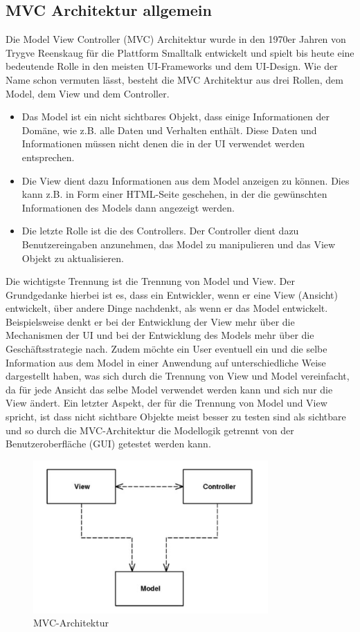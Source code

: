 \subsection{MVC Architektur allgemein}
Die Model View Controller (MVC) Architektur wurde in den 1970er Jahren von Trygve Reenskaug für die Plattform Smalltalk entwickelt und spielt bis heute eine bedeutende Rolle in den meisten UI-Frameworks und dem UI-Design\autocite[S. 330]{PEAA2002}.
Wie der Name schon vermuten lässt, besteht die MVC Architektur aus drei Rollen, dem Model, dem View und dem Controller.
\begin{itemize}
\item Das Model ist ein nicht sichtbares Objekt, dass einige Informationen der Domäne, wie z.B. alle Daten und Verhalten enthält. Diese Daten und Informationen müssen nicht denen die in der UI verwendet werden entsprechen\autocite[S. 330]{PEAA2002}.

\item Die View dient dazu Informationen aus dem Model anzeigen zu können. Dies kann z.B. in Form einer HTML-Seite geschehen, in der die gewünschten Informationen des Models dann angezeigt werden\autocite[S. 330]{PEAA2002}.

\item Die letzte Rolle ist die des Controllers. Der Controller dient dazu Benutzereingaben anzunehmen, das Model zu manipulieren und das View Objekt zu aktualisieren\autocite[S. 330f]{PEAA2002}.
\end{itemize}
Die wichtigste Trennung ist die Trennung von Model und View. Der Grundgedanke hierbei ist es, dass ein Entwickler, wenn er eine View (Ansicht) entwickelt, über andere Dinge nachdenkt, als wenn er das Model entwickelt. Beispielsweise denkt er bei der Entwicklung der View mehr über die Mechanismen der UI und bei der Entwicklung des Models mehr über die Geschäftsstrategie nach. Zudem möchte ein User eventuell ein und die selbe Information aus dem Model in einer Anwendung auf unterschiedliche Weise dargestellt haben, was sich durch die Trennung von View und Model vereinfacht, da für jede Ansicht das selbe Model verwendet werden kann und sich nur die View ändert. Ein letzter Aspekt, der für die Trennung von Model und View spricht, ist dass nicht sichtbare Objekte meist besser zu testen sind als sichtbare und so durch die MVC-Architektur die Modellogik getrennt von der Benutzeroberfläche (GUI) getestet werden kann.
\begin{figure}[h]
\centering
\includegraphics[width=0.80\textwidth]{img/MVC-Allgemein(Fowler).png}
\caption {MVC-Architektur}
\end{figure}
